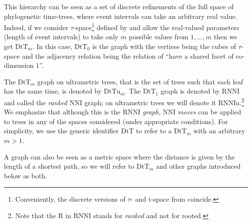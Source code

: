 \documentclass[11pt]{amsart}
\theoremstyle{definition}
\newcommand{\nni}{\mathrm{NNI}}
\newcommand{\rnni}{\mathrm{RNNI}}
\newcommand{\rnniu}{\mathrm{RNNIu}}
\newcommand{\dtt}{\mathrm{DtT}}
\newcommand{\dttu}{\mathrm{DtTu}}
\begin{document}
This hierarchy can be seen as a set of discrete refinements of the full space of phylogenetic time-trees, where event intervals can take an arbitrary real value.
Indeed, if we consider
$\tau$-space\footnote{Conveniently, the discrete versions of $\tau$- and $\mathrm t$-space from \autocite{Gavryushkin2014-bw} coincide.}
defined by \textcite{Gavryushkin2014-bw} and allow the real-valued parameters (length of event intervals) to take only $m$ possible values from $1,\ldots,m$ then we get $\dtt_m$.
In this case, $\dtt_0$ is the graph with the vertices being the cubes of $\tau$-space and the adjacency relation being the relation of ``have a shared facet of co-dimension $1$''.

The $\dtt_m$ graph on ultrametric trees, that is the set of trees such that each leaf has the same time, is denoted by $\dttu_m$.
The $\dtt_1$ graph is denoted by $\rnni$ and called the \emph{ranked $\nni$} graph; on ultrametric trees we will denote it $\rnniu$.\footnote{
Note that the R in $\rnni$ stands for \emph{ranked} and not for rooted.}
We emphasize that although this is the $\rnni$ \emph{graph}, NNI \emph{moves} can be applied to trees in any of the spaces considered (under appropriate conditions).
For simplicity, we use the generic identifier $\dtt$ to refer to a $\dtt_m$ with an arbitrary $m > 1$.

A graph can also be seen as a metric space where the distance is given by the length of a shortest path, so we will refer to $\dtt_m$ and other graphs introduced below as both.
\end{document}
